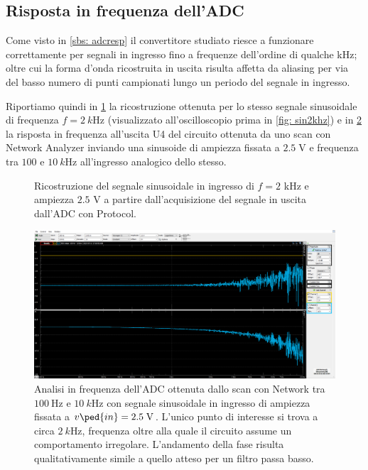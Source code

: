 \documentclass[10pt, a4paper, italian]{article}
\begin{document}
\subsection{Risposta in frequenza dell'ADC}
\label{sbs: freq}
Come visto in \cref{sbs: adcresp} il convertitore studiato riesce a funzionare
correttamente per segnali in ingresso fino a frequenze dell'ordine di qualche
kHz; oltre cui la forma d'onda ricostruita in uscita risulta affetta da
aliasing per via del basso numero di punti campionati lungo un periodo del
segnale in ingresso.

Riportiamo quindi in \cref{fig: sin2khzpy} la ricostruzione ottenuta per lo
stesso segnale sinusoidale di frequenza $f = \SI{2}{k\Hz}$ (visualizzato
all'oscilloscopio prima in \cref{fig: sin2khz}) e in \cref{fig: net}
la risposta in frequenza all'uscita U4 del circuito ottenuta da uno scan con
Network Analyzer inviando una sinusoide di ampiezza fissata a $2.5 \; \si{\V}$
e frequenza tra $100$ e $\SI{10}{k\Hz}$ all'ingresso analogico dello stesso.
\begin{figure}[htbp]
    \centering
    \caption{Ricostruzione del segnale sinusoidale in ingresso di $f = 2$
    kHz e ampiezza $2.5$ V a partire dall'acquisizione del segnale in uscita
    dall'ADC con Protocol.
    \label{fig: sin2khzpy}}
\end{figure}
\begin{figure}[htbp]
	\centering
	\includegraphics[scale=0.335]{Net100-10k}
	\caption{Analisi in frequenza dell'ADC ottenuta dallo scan con Network
	tra $\SI{100}{\Hz}$ e $\SI{10}{k\Hz}$ con segnale sinusoidale in ingresso
	di ampiezza fissata a $v\ped{in} = 2.5 \; \si{\V}$. L'unico punto di
	interesse si trova a circa $\SI{2}{k\Hz}$, frequenza oltre alla quale il
	circuito assume un comportamento irregolare. L'andamento della fase risulta
	qualitativamente simile a quello atteso per un filtro passa basso.
	\label{fig: net}}
\end{figure}
\end{document}
